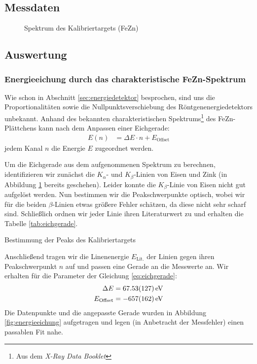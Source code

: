 \documentclass[11pt, a4paper]{article}
\begin{document}
\subsection{Messdaten}
\begin{figure}[!h]
\centering

\caption{Spektrum des Kalibriertargets (FeZn)}
\label{fig:kalibrierung}
\end{figure}

\subsection{Auswertung}
\subsubsection{Energieeichung durch das charakteristische FeZn-Spektrum}
Wie schon in Abschnitt \ref{sec:energiedetektor} besprochen, sind uns die Proportionalitäten sowie die Nullpunktsverschiebung des Röntgenenergiedetektors unbekannt.
Anhand des bekannten charakteristischen Spektrums\footnote{Aus dem \emph{X-Ray Data Booklet}\cite{booklet}} des FeZn-Plättchens kann nach dem Anpassen einer Eichgerade:
\begin{align}
  E(n) &= \Delta E \cdot n + E_\mathrm{Offset}
  \label{eq:eichgerade}
\end{align}
jedem Kanal $n$ die Energie $E$ zugeordnet werden.

Um die Eichgerade aus dem aufgenommenen Spektrum zu berechnen, identifizieren wir zunächst die $K_\alpha$- und $K_\beta$-Linien von Eisen und Zink (in Abbildung \ref{fig:kalibrierung} bereits geschehen).
Leider konnte die $K_\beta$-Linie von Eisen nicht gut aufgelöst werden.
Nun bestimmen wir die Peakschwerpunkte optisch, wobei wir für die beiden $\beta$-Linien etwas größere Fehler schätzen, da diese nicht sehr scharf sind.
Schließlich ordnen wir jeder Linie ihren Literaturwert zu und erhalten die Tabelle \ref{tab:eichgerade}.
\begin{table}[h]
\centering

\caption{Bestimmung der Peaks des Kalibriertargets}
\label{tab:eichgerade}
\end{table}

Anschließend tragen wir die Linenenergie $E_\mathrm{Lit.}$ der Linien gegen ihren Peakschwerpunkt $n$ auf und passen eine Gerade an die Messwerte an.
Wir erhalten für die Parameter der Gleichung \ref{eq:eichgerade}:
\begin{align}
  \Delta E &= \SI{67,53 +- 1,27}{\electronvolt}\\
  E_\mathrm{Offset} &= \SI{-657 +- 162}{\electronvolt}
\end{align}
Die Datenpunkte und die angepasste Gerade wurden in Abbildung \ref{fig:energieeichung} aufgetragen und legen (in Anbetracht der Messfehler) einen passablen Fit nahe.
\end{document}

